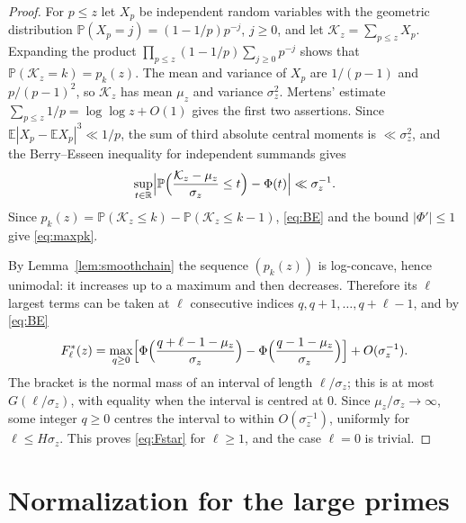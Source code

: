 \documentclass[11pt,a4paper]{article}
\numberwithin{equation}{section}
\theoremstyle{plain}
\theoremstyle{definition}
\theoremstyle{remark}
\newcommand{\R}{\mathbb{R}}
\newcommand{\PP}{\mathbb{P}}
\newcommand{\EE}{\mathbb{E}}
\newcommand{\cK}{\mathcal{K}}
\begin{document}
\begin{proof}
For $p\le z$ let $X_p$ be independent random variables with the geometric distribution $\PP(X_p=j)=(1-1/p)p^{-j}$, $j\ge0$, and let $\cK_z=\sum_{p\le z}X_p$. Expanding the product $\prod_{p\le z}(1-1/p)\sum_{j\ge0}p^{-j}$ shows that $\PP(\cK_z=k)=p_k(z)$. The mean and variance of $X_p$ are $1/(p-1)$ and $p/(p-1)^2$, so $\cK_z$ has mean $\mu_z$ and variance $\sigma_z^2$. Mertens' estimate $\sum_{p\le z}1/p=\log\log z+O(1)$ \cite[Theorem~6.10]{Dusart} gives the first two assertions. Since $\EE|X_p-\EE X_p|^3\ll1/p$, the sum of third absolute central moments is $\ll\sigma_z^2$, and the Berry--Esseen inequality for independent summands \cite[Chapter~V]{Petrov} gives
\begin{equation}\label{eq:BE}
\sup_{t\in\R}\Bigl|\PP\Bigl(\frac{\cK_z-\mu_z}{\sigma_z}\le t\Bigr)-\Phi(t)\Bigr|\ll\sigma_z^{-1}.
\end{equation}
Since $p_k(z)=\PP(\cK_z\le k)-\PP(\cK_z\le k-1)$, \eqref{eq:BE} and the bound $|\Phi'|\le1$ give \eqref{eq:maxpk}.

By Lemma~\ref{lem:smoothchain} the sequence $(p_k(z))$ is log-concave, hence unimodal: it increases up to a maximum and then decreases. Therefore its $\ell$ largest terms can be taken at $\ell$ consecutive indices $q,q+1,\dots,q+\ell-1$, and by \eqref{eq:BE}
\[
F^*_\ell(z)=\max_{q\ge0}\Bigl[\Phi\Bigl(\frac{q+\ell-1-\mu_z}{\sigma_z}\Bigr)-\Phi\Bigl(\frac{q-1-\mu_z}{\sigma_z}\Bigr)\Bigr]+O(\sigma_z^{-1}).
\]
The bracket is the normal mass of an interval of length $\ell/\sigma_z$; this is at most $G(\ell/\sigma_z)$, with equality when the interval is centred at $0$. Since $\mu_z/\sigma_z\to\infty$, some integer $q\ge0$ centres the interval to within $O(\sigma_z^{-1})$, uniformly for $\ell\le H\sigma_z$. This proves \eqref{eq:Fstar} for $\ell\ge1$, and the case $\ell=0$ is trivial.
\end{proof}

\section{Normalization for the large primes}\label{sec:roughnorm}
\end{document}
